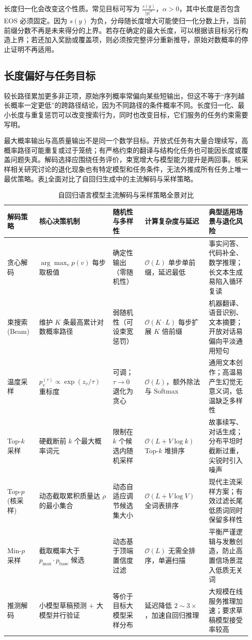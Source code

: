 \documentclass[../textbook.tex]{subfiles}
\begin{document}
长度归一化会改变这个性质。常见目标可写为 $\frac{s(y)}{|y|^\alpha}$，$\alpha>0$，其中长度是否包含 EOS 必须固定。因为 $s(y)$ 为负，分母随长度增大可能使归一化分数上升，当前前缀分数不再是未来得分的上界。若存在确定的最大长度，可以根据该目标另行构造上界；若还加入奖励或覆盖项，则必须按完整评分重新推导，原始对数概率的停止证明不再适用。

\subsection{长度偏好与任务目标}
较长路径累加更多非正项，原始序列概率常偏向某些短输出，但这不等于“序列越长概率一定更低”的跨路径结论，因为不同路径的条件概率不同。长度归一化、最小长度与重复惩罚可以改变搜索行为，同时也改变目标，它们服务的任务约束需要写明。

最大概率输出与高质量输出不是同一个数学目标。开放式任务有大量合理续写，高概率路径可能重复或过于笼统；有严格约束的翻译与结构化任务也可能因长度或覆盖问题失真。解码选择应围绕任务评价，束宽增大与模型能力提升是两回事。核采样相关研究讨论的退化现象也有特定模型和任务条件，无法外推成所有任务上唯一最优策略\cite{holtzman2020degeneration}。表\ref{tab:decoding-comparison}全面对比了自回归生成中的主流解码与采样策略。

\begin{table}[htbp]
\centering
\caption{自回归语言模型主流解码与采样策略全景对比}\label{tab:decoding-comparison}
\begin{tabularx}{\linewidth}{p{18mm}p{22mm}p{18mm}p{22mm}X}
\toprule
解码策略 & 核心决策机制 & 随机性与多样性 & 计算复杂度与延迟 & 典型适用场景与退化风险 \\\midrule
贪心解码 & $\arg\max_v p(v)$ 每步取极值 & 确定性输出（零随机性） & $\mathcal{O}(L)$ 单步单前缀，延迟最低 & 事实问答、代码补全、数学推理；长文本生成易陷入循环复读 \\
束搜索 (Beam) & 维护 $K$ 条最高累计对数概率路径 & 弱随机性（可设束宽惩罚） & $\mathcal{O}(K \cdot L)$ 每步扩展 $K$ 倍前缀 & 机器翻译、语音识别、文本摘要；开放对话易偏向平淡通用短句 \\
温度采样 & $p_v^{(\tau)} \propto \exp(z_v/\tau)$ 重标度 & 可调；$\tau\to0$ 退化为贪心 & $\mathcal{O}(L)$，额外除法与 Softmax & 通用文本创作；高温易产生幻觉无意义词，低温缺乏多样性 \\
Top-$k$ 采样 & 硬截断前 $k$ 个最大概率词元 & 限制在 $k$ 个候选内随机采样 & $\mathcal{O}(L + V\log k)$ Top-$k$ 堆排序 & 故事续写、对话生成；分布平坦时截断过重，尖锐时引入噪声 \\
Top-$p$ (核采样) & 动态截取累积质量达 $\rho$ 的最小集合 & 动态自适应调节候选集大小 & $\mathcal{O}(L + V\log V)$ 全词表排序 & 现代主流采样方案；有效过滤长尾低质词同时保留多样性 \\
Min-$p$ 采样 & 截取概率大于 $p_{\max}\cdot p_{\text{base}}$ 候选 & 动态基于顶端置信度过滤 & $\mathcal{O}(L)$ 无需全排序，单遍扫描 & 平衡严谨逻辑与发散创造，防止高置信场景混入低质无关词 \\
推测解码 & 小模型草稿预测 $+$ 大模型并行验证 & 等价于目标大模型采样分布 & 延迟降低 $2\sim3\times$，加速自回归推理 & 大规模在线服务推理加速；要求草稿模型接受率较高 \\
\bottomrule
\end{tabularx}
\end{table}
\end{document}
